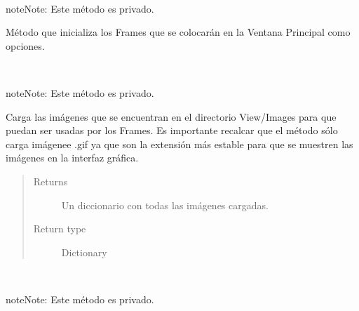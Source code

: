 \documentclass[class=report, crop=false]{standalone}
\begin{document}
\begin{fulllineitems}
\begin{fulllineitems}
\end{fulllineitems}

\begin{fulllineitems}

~

\begin{notice}{note}{Note:}
Este método es privado.
\end{notice}

Método que inicializa los Frames que se 
colocarán en la Ventana Principal como opciones.

\end{fulllineitems}

\begin{fulllineitems}

~

\begin{notice}{note}{Note:}
Este método es privado.
\end{notice}

Carga las imágenes que se encuentran en el directorio 
View/Images para que puedan ser usadas por los Frames.\break
Es importante recalcar que el método sólo carga imágenee .gif 
ya que son la extensión más estable para que se muestren 
las imágenes en la interfaz gráfica.

\begin{quote}\begin{description}
\item[{Returns}] \leavevmode
Un diccionario con todas las imágenes cargadas.
\item[{Return type}] \leavevmode
Dictionary
\end{description}\end{quote}

\end{fulllineitems}

\begin{fulllineitems}

~

\begin{notice}{note}{Note:}
Este método es privado.
\end{notice}


\end{fulllineitems}
\end{fulllineitems}
\end{document}
